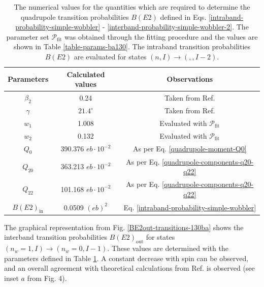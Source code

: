 \begin{table}
    \centering
    \begin{tabular}{|c|c|c|}
    \hline
    Parameters & Calculated values & Observations                                               \\ \hline
    $\beta_2$  & 0.24              & Taken from Ref. \cite{chen2019transverse}                 \\ \hline
    $\gamma$   & $21.4^\circ$      & Taken from Ref. \cite{chen2019transverse}                 \\ \hline
    $w_1$      & 1.008             & Evaluated with $\mathcal{P}_\text{fit}$                    \\ \hline
    $w_2$      & 0.132             & Evaluated with $\mathcal{P}_\text{fit}$                    \\ \hline
    $Q_0$      & 390.376 $eb\cdot10^{-2}$      & As per Eq. \ref{quadrupole-moment-Q0}                                                           \\ \hline
    $Q_{20}$   & 363.213 $eb\cdot10^{-2}$          & As per Eq. \ref{quadrupole-components-q20-q22}                                                            \\ \hline
    $Q_{22}$   & 101.168 $eb\cdot10^{-2}$           & As per Eq. \ref{quadrupole-components-q20-q22}                                                            \\ \hline
    $B(E2)_\text{in}$ &        0.0509 $(eb)^2$          & Eq. \ref{intraband-probability-simple-wobbler}              \\ \hline
    \end{tabular}%
    \caption{The numerical values for the quantities which are required to determine the quadrupole transition probabilities $B(E2)$ defined in Eqs. \ref{intraband-probability-simple-wobbler} - \ref{interband-probability-simple-wobbler-2}. The parameter set $\mathcal{P}_\text{fit}$ was obtained through the fitting procedure and the values are shown in Table \ref{table-params-ba130}. The intraband transition probabilities $B(E2)$ are evaluated for states $(n,I)\to(,,I-2)$.}
    \label{transition-parameters-ba130}
\end{table}

The graphical representation from Fig. \ref{BE2out-transitions-130ba} shows the interband transition probabilities $B(E2)_\text{out}$ for states $(n_w=1,I)\to(n_w=0,I-1)$. These values are determined with the parameters defined in Table \ref{transition-parameters-ba130}. A constant decrease with spin can be observed, and an overall agreement with theoretical calculations from Ref. \cite{chen2019transverse} is observed (see inset $a$ from Fig. 4).

